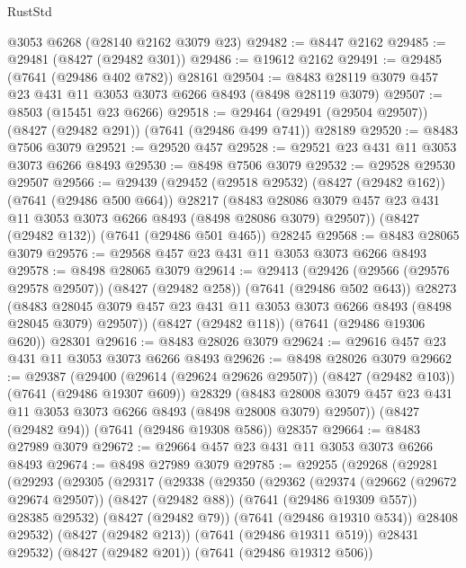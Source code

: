 \begin{lexlean}{RustStd}
\begin{coremodule}
    @3053
    @6268
    (@28140 @2162 @3079 @23)
@29482 := @8447 @2162
@29485 := @29481 (@8427 (@29482 @301))
@29486 := @19612 @2162
@29491 := @29485 (@7641 (@29486 @402 @782)) @28161
@29504 := @8483 @28119 @3079 @457 @23 @431 @11 @3053 @3073 @6266 @8493 (@8498 @28119 @3079)
@29507 := @8503 (@15451 @23 @6266)
@29518 := @29464 (@29491 (@29504 @29507)) (@8427 (@29482 @291)) (@7641 (@29486 @499 @741)) @28189
@29520 := @8483 @7506 @3079
@29521 := @29520 @457
@29528 := @29521 @23 @431 @11 @3053 @3073 @6266 @8493
@29530 := @8498 @7506 @3079
@29532 := @29528 @29530 @29507
@29566 := @29439
    (@29452
      (@29518 @29532)
      (@8427 (@29482 @162))
      (@7641 (@29486 @500 @664))
      @28217
      (@8483 @28086 @3079 @457 @23 @431 @11 @3053 @3073 @6266 @8493 (@8498 @28086 @3079) @29507))
    (@8427 (@29482 @132))
    (@7641 (@29486 @501 @465))
    @28245
@29568 := @8483 @28065 @3079
@29576 := @29568 @457 @23 @431 @11 @3053 @3073 @6266 @8493
@29578 := @8498 @28065 @3079
@29614 := @29413
    (@29426
      (@29566 (@29576 @29578 @29507))
      (@8427 (@29482 @258))
      (@7641 (@29486 @502 @643))
      @28273
      (@8483 @28045 @3079 @457 @23 @431 @11 @3053 @3073 @6266 @8493 (@8498 @28045 @3079) @29507))
    (@8427 (@29482 @118))
    (@7641 (@29486 @19306 @620))
    @28301
@29616 := @8483 @28026 @3079
@29624 := @29616 @457 @23 @431 @11 @3053 @3073 @6266 @8493
@29626 := @8498 @28026 @3079
@29662 := @29387
    (@29400
      (@29614 (@29624 @29626 @29507))
      (@8427 (@29482 @103))
      (@7641 (@29486 @19307 @609))
      @28329
      (@8483 @28008 @3079 @457 @23 @431 @11 @3053 @3073 @6266 @8493 (@8498 @28008 @3079) @29507))
    (@8427 (@29482 @94))
    (@7641 (@29486 @19308 @586))
    @28357
@29664 := @8483 @27989 @3079
@29672 := @29664 @457 @23 @431 @11 @3053 @3073 @6266 @8493
@29674 := @8498 @27989 @3079
@29785 := @29255
    (@29268
      (@29281
        (@29293
          (@29305
            (@29317
              (@29338
                (@29350
                  (@29362
                    (@29374
                      (@29662 (@29672 @29674 @29507))
                      (@8427 (@29482 @88))
                      (@7641 (@29486 @19309 @557))
                      @28385
                      @29532)
                    (@8427 (@29482 @79))
                    (@7641 (@29486 @19310 @534))
                    @28408
                    @29532)
                  (@8427 (@29482 @213))
                  (@7641 (@29486 @19311 @519))
                  @28431
                  @29532)
                (@8427 (@29482 @201))
                (@7641 (@29486 @19312 @506))

\end{coremodule}
\end{lexlean}
